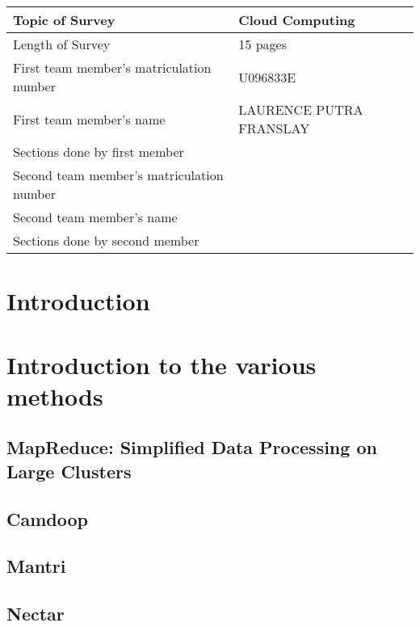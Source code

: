 \documentclass[]{article}
\begin{document}
\begin{table}[here]
\centering
\begin{tabularx}{0.7\textwidth}{| X | X | }
\hline
Topic of Survey						& 	Cloud Computing\\
\hline
Length of Survey						& 	15 pages\\
\hline
First team member's matriculation number	&	U096833E\\
\hline
First team member's name				&	LAURENCE PUTRA FRANSLAY\\
\hline
Sections done by first member				& 	\\
\hline
Second team member's matriculation number	&	\\
\hline
Second team member's name				&	\\
\hline
Sections done by second member			& 	\\
\hline

\hline
\end{tabularx}
\end{table}

\pagebreak

\section{Introduction}


\section{Introduction to the various methods}
\subsection{MapReduce: Simplified Data Processing on Large Clusters}


\subsection{Camdoop}

\subsection{Mantri}

\subsection{Nectar}
\end{document}
